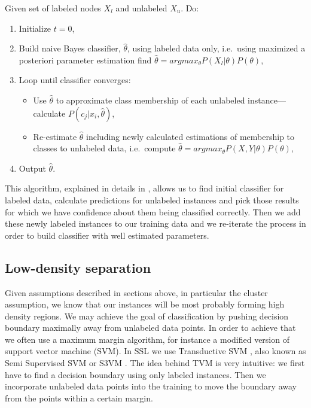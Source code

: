 \documentclass[12pt, a4paper, pdflatex]{report}
\begin{document}
Given set of labeled nodes $X_l$ and unlabeled $X_u$. Do:\\
\begin{enumerate}
\item Initialize $t  = 0 $,
\item Build naive Bayes classifier, $ \hat{\theta}$, using labeled data only, i.e.\ using maximized a posteriori parameter estimation find $ \hat{\theta} = argmax_{\theta} P(X_{l} | \theta)P(\theta) $,
\item Loop until classifier converges:
	\begin{itemize}
	\item Use $\hat{\theta}$ to approximate class membership of each unlabeled instance--- calculate $ P(c_j|x_i, \hat{\theta})$,
	\item Re-estimate $\hat{\theta}$ including newly calculated estimations of membership to classes to unlabeled data, i.e.\ compute $ \hat{\theta} = argmax_{\theta} P(X, Y | \theta)P(\theta) $,
	\end{itemize}
\item Output $\hat{\theta}$.

\end{enumerate}

This algorithm, explained in details in \cite{chapelle06}, allows us to find initial classifier for labeled data, calculate predictions for unlabeled instances and pick those results for which we have confidence about them being classified correctly. Then we add these newly labeled instances to our training data and we re-iterate the process in order to build classifier with well estimated parameters.

\subsection{Low-density separation}

Given assumptions described in sections above, in particular the cluster assumption, we know that our instances will be most probably forming high density regions. We may achieve the goal of classification by pushing decision boundary maximally away from unlabeled data points.
In order to achieve that we often use a maximum margin algorithm, for instance a modified version of support vector machine (SVM)\cite{chapelle06,Zhu06semi}. In SSL we use Transductive SVM \cite{chapelle06}, also known as Semi Supervised SVM or S3VM \cite{Zhu06semi}.
The idea behind TVM is very intuitive: we first have to find a decision boundary using only labeled instances. Then we incorporate unlabeled data points into the training to move the boundary away from the points within a certain margin.\\[1cm]
\end{document}
